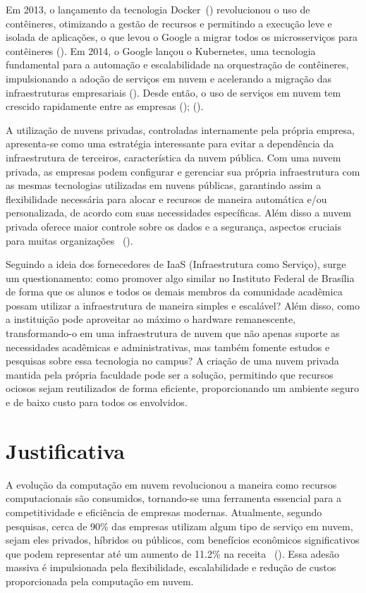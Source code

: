 Em 2013, o lançamento da tecnologia Docker~(\cite{DockerDocumentation}) revolucionou o uso de contêineres, otimizando a gestão de recursos e permitindo a execução leve e isolada de aplicações, o que levou o Google a migrar todos os microsserviços para contêineres (\cite{HistoryOfContainers}). Em 2014, o Google lançou o Kubernetes, uma tecnologia fundamental para a automação e escalabilidade na orquestração de contêineres, impulsionando a adoção de serviços em nuvem e acelerando a migração das infraestruturas empresariais (\cite{CompaniesMigrateToAWS}). Desde então, o uso de serviços em nuvem tem crescido rapidamente entre as empresas (\cite{GrowthCompaniesInCloud_one}); (\cite{GrowthCompaniesInCloud_two}).

A utilização de nuvens privadas, controladas internamente pela própria empresa, apresenta-se como uma estratégia interessante para evitar a dependência da infraestrutura de terceiros, característica da nuvem pública. Com uma nuvem privada, as empresas podem configurar e gerenciar sua própria infraestrutura com as mesmas tecnologias utilizadas em nuvens públicas, garantindo assim a flexibilidade necessária para alocar e recursos de maneira automática e/ou personalizada, de acordo com suas necessidades específicas. Além disso a nuvem privada oferece maior controle sobre os dados e a segurança, aspectos cruciais para muitas organizações ~(\cite{privateCloudAdvantagesDisadvantages}).

Seguindo a ideia dos fornecedores de IaaS (Infraestrutura como Serviço), surge um questionamento: como promover algo similar no Instituto Federal de Brasília de forma que os alunos e todos os demais membros da comunidade acadêmica possam utilizar a infraestrutura de maneira simples e escalável? Além disso, como a instituição pode aproveitar ao máximo o hardware remanescente, transformando-o em uma infraestrutura de nuvem que não apenas suporte as necessidades acadêmicas e administrativas, mas também fomente estudos e pesquisas sobre essa tecnologia no campus? A criação de uma nuvem privada mantida pela própria faculdade pode ser a solução, permitindo que recursos ociosos sejam reutilizados de forma eficiente, proporcionando um ambiente seguro e de baixo custo para todos os envolvidos.

\section{Justificativa} 

A evolução da computação em nuvem revolucionou a maneira como recursos computacionais são consumidos, tornando-se uma ferramenta essencial para a competitividade e eficiência de empresas modernas. Atualmente, segundo pesquisas, cerca de 90\% das empresas utilizam algum tipo de serviço em nuvem, sejam eles privados, híbridos ou públicos, com benefícios econômicos significativos que podem representar até um aumento de 11.2\% na receita ~(\cite{StatisticsCloud, ProfitCloud}). Essa adesão massiva é impulsionada pela flexibilidade, escalabilidade e redução de custos proporcionada pela computação em nuvem.

